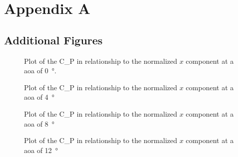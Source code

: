 \chapter{Appendix A}

\section{Additional Figures}

\begin{figure}[htpb]
    \centering
    
    \caption[Plot of the Coefficient of pressure in relationship to the normalized x component at a Angle of attack of 0 degrees]{Plot of the \gls{C_P} in relationship to the normalized $x$ component at a \acrshort{aoa} of \qty{0} {\degree}.}
    \label{fig:C_P vs. 0° Angle of Attack.svg}
\end{figure}

\begin{figure}[htpb]
    \centering
    
    \caption[Plot of the Coefficient of pressure in relationship to the normalized x component at a Angle of attack of 4 degrees]{Plot of the \gls{C_P} in relationship to the normalized $x$ component at a \acrshort{aoa} of \qty{4} {\degree}}
    \label{fig:C_P vs. 4° Angle of Attack.svg}
\end{figure}

\begin{figure}[htpb]
    \centering
    
    \caption[Plot of the Coefficient of pressure in relationship to the normalized x component at a Angle of attack of 8 degrees]{Plot of the \gls{C_P} in relationship to the normalized $x$ component at a \acrshort{aoa} of \qty{8} {\degree}}
    \label{fig:C_P vs. 8° Angle of Attack.svg}
\end{figure}

\begin{figure}[htpb]
    \centering
    
    \caption[Plot of the Coefficient of pressure in relationship to the normalized x component at a Angle of attack of 12 degrees]{Plot of the \gls{C_P} in relationship to the normalized $x$ component at a \acrshort{aoa} of \qty{12} {\degree}}
    \label{fig:C_P vs. 12° Angle of Attack.svg}
\end{figure}

